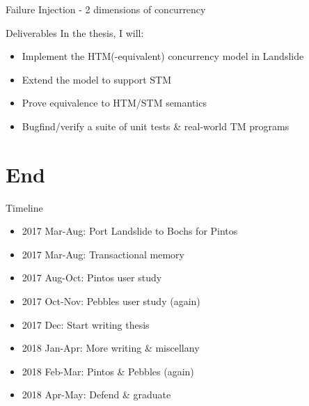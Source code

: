 \documentclass[xcolor=dvipsnames]{beamer}
\begin{document}
\begin{frame}{Failure Injection - 2 dimensions of concurrency}
\end{frame}

\begin{frame}{Deliverables}
	In the thesis, I will:
	\begin{itemize}
		\item Implement the HTM(-equivalent) concurrency model in Landslide
		\item Extend the model to support STM
		\item Prove equivalence to HTM/STM semantics %
		\item Bugfind/verify a suite of unit tests \& real-world TM programs
	\end{itemize}
\end{frame}


\section{End}

\begin{frame}{Timeline}
	\begin{itemize}
		\item 2017 Mar-Aug: Port Landslide to Bochs for Pintos
		\item 2017 Mar-Aug: Transactional memory
		\item 2017 Aug-Oct: Pintos user study
		\item 2017 Oct-Nov: Pebbles user study (again)
		\item 2017 Dec:     Start writing thesis
		\item 2018 Jan-Apr: More writing \& miscellany
		\item 2018 Feb-Mar: Pintos \& Pebbles (again)
		\item 2018 Apr-May: Defend \& graduate
	\end{itemize}
\end{frame}

\end{document}
